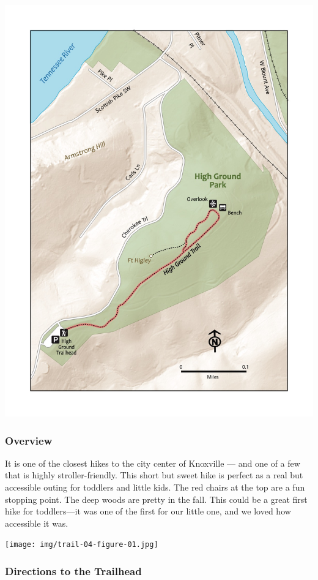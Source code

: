 \documentclass[
  letterpaper,
  DIV=11,
  numbers=noendperiod]{scrartcl}
\begin{document}
\includegraphics{maps/trail-04-map.jpeg}

\hypertarget{overview-3}{%
\subsubsection{Overview}\label{overview-3}}

It is one of the closest hikes to the city center of Knoxville --- and
one of a few that is highly stroller-friendly. This short but sweet hike
is perfect as a real but accessible outing for toddlers and little kids.
The red chairs at the top are a fun stopping point. The deep woods are
pretty in the fall. This could be a great first hike for toddlers---it
was one of the first for our little one, and we loved how accessible it
was.

\texttt{[image: img/trail-04-figure-01.jpg]}

\hypertarget{directions-to-the-trailhead-3}{%
\subsubsection{Directions to the
Trailhead}\label{directions-to-the-trailhead-3}}
\end{document}
